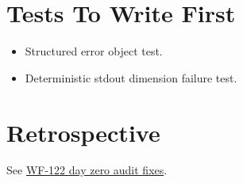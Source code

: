 \section{Tests To Write First}\label{record-167-tests-to-write-first}

\begin{itemize}
\tightlist
\item
  Structured error object test.
\item
  Deterministic stdout dimension failure test.
\end{itemize}

\section{Retrospective}\label{record-167-retrospective}

See \href{https://github.com/flyingrobots/bijou/blob/cbd70612140e7a450d764b3c7be1c6af878b99bc/docs/method/retro/WF-122-day-zero-audit-fixes.md}{WF-122 day zero audit fixes}.

